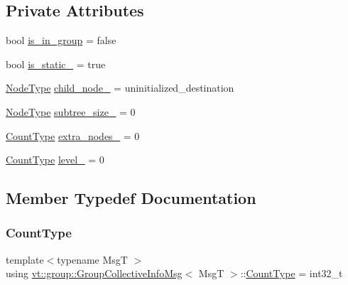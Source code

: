\subsection*{Private Attributes}
\begin{DoxyCompactItemize}
\item 
bool \hyperlink{structvt_1_1group_1_1_group_collective_info_msg_aaab4ffad3e4bb20c80f6a7abbb1934ea}{is\+\_\+in\+\_\+group} = false
\item 
bool \hyperlink{structvt_1_1group_1_1_group_collective_info_msg_a6acef8fb045d7da296e36c83ea62acd9}{is\+\_\+static\+\_\+} = true
\item 
\hyperlink{namespacevt_a866da9d0efc19c0a1ce79e9e492f47e2}{Node\+Type} \hyperlink{structvt_1_1group_1_1_group_collective_info_msg_a263c02930d9247a643ea515657f1140a}{child\+\_\+node\+\_\+} = uninitialized\+\_\+destination
\item 
\hyperlink{namespacevt_a866da9d0efc19c0a1ce79e9e492f47e2}{Node\+Type} \hyperlink{structvt_1_1group_1_1_group_collective_info_msg_a7d4e68355c49b5ab2e05771867d2c343}{subtree\+\_\+size\+\_\+} = 0
\item 
\hyperlink{structvt_1_1group_1_1_group_collective_info_msg_a3d20316314d3cc3ac13ff4c5250203a5}{Count\+Type} \hyperlink{structvt_1_1group_1_1_group_collective_info_msg_af8421eb6d18618341f60e76ee0bb9cee}{extra\+\_\+nodes\+\_\+} = 0
\item 
\hyperlink{structvt_1_1group_1_1_group_collective_info_msg_a3d20316314d3cc3ac13ff4c5250203a5}{Count\+Type} \hyperlink{structvt_1_1group_1_1_group_collective_info_msg_a0bb143e97c533424bc1e17f1ec950be3}{level\+\_\+} = 0
\end{DoxyCompactItemize}


\subsection{Member Typedef Documentation}
\mbox{\label{structvt_1_1group_1_1_group_collective_info_msg_a3d20316314d3cc3ac13ff4c5250203a5}} 
\subsubsection{\texorpdfstring{Count\+Type}{CountType}}
{\footnotesize\ttfamily template$<$typename MsgT $>$ \\
using \hyperlink{structvt_1_1group_1_1_group_collective_info_msg}{vt\+::group\+::\+Group\+Collective\+Info\+Msg}$<$ MsgT $>$\+::\hyperlink{structvt_1_1group_1_1_group_collective_info_msg_a3d20316314d3cc3ac13ff4c5250203a5}{Count\+Type} =  int32\+\_\+t}

